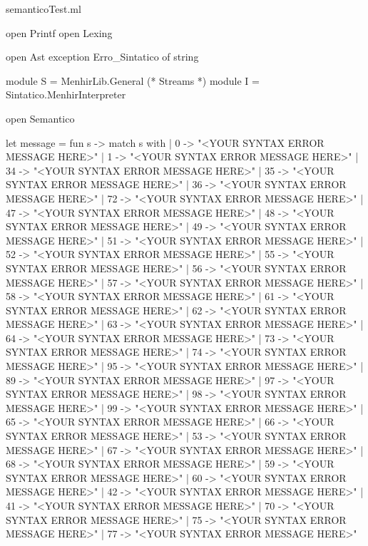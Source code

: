 \documentclass[12pt,a4paper,twoside]{article}
\begin{document}
semanticoTest.ml
\begin{terminal}
open Printf
open Lexing

open Ast
exception Erro_Sintatico of string

module S = MenhirLib.General (* Streams *)
module I = Sintatico.MenhirInterpreter

open Semantico

let message =
  fun s ->
    match s with
    | 0 ->
        "<YOUR SYNTAX ERROR MESSAGE HERE>\n"
    | 1 ->
        "<YOUR SYNTAX ERROR MESSAGE HERE>\n"
    | 34 ->
        "<YOUR SYNTAX ERROR MESSAGE HERE>\n"
    | 35 ->
        "<YOUR SYNTAX ERROR MESSAGE HERE>\n"
    | 36 ->
        "<YOUR SYNTAX ERROR MESSAGE HERE>\n"
    | 72 ->
        "<YOUR SYNTAX ERROR MESSAGE HERE>\n"
    | 47 ->
        "<YOUR SYNTAX ERROR MESSAGE HERE>\n"
    | 48 ->
        "<YOUR SYNTAX ERROR MESSAGE HERE>\n"
    | 49 ->
        "<YOUR SYNTAX ERROR MESSAGE HERE>\n"
    | 51 ->
        "<YOUR SYNTAX ERROR MESSAGE HERE>\n"
    | 52 ->
        "<YOUR SYNTAX ERROR MESSAGE HERE>\n"
    | 55 ->
        "<YOUR SYNTAX ERROR MESSAGE HERE>\n"
    | 56 ->
        "<YOUR SYNTAX ERROR MESSAGE HERE>\n"
    | 57 ->
        "<YOUR SYNTAX ERROR MESSAGE HERE>\n"
    | 58 ->
        "<YOUR SYNTAX ERROR MESSAGE HERE>\n"
    | 61 ->
        "<YOUR SYNTAX ERROR MESSAGE HERE>\n"
    | 62 ->
        "<YOUR SYNTAX ERROR MESSAGE HERE>\n"
    | 63 ->
        "<YOUR SYNTAX ERROR MESSAGE HERE>\n"
    | 64 ->
        "<YOUR SYNTAX ERROR MESSAGE HERE>\n"
    | 73 ->
        "<YOUR SYNTAX ERROR MESSAGE HERE>\n"
    | 74 ->
        "<YOUR SYNTAX ERROR MESSAGE HERE>\n"
    | 95 ->
        "<YOUR SYNTAX ERROR MESSAGE HERE>\n"
    | 89 ->
        "<YOUR SYNTAX ERROR MESSAGE HERE>\n"
    | 97 ->
        "<YOUR SYNTAX ERROR MESSAGE HERE>\n"
    | 98 ->
        "<YOUR SYNTAX ERROR MESSAGE HERE>\n"
    | 99 ->
        "<YOUR SYNTAX ERROR MESSAGE HERE>\n"
    | 65 ->
        "<YOUR SYNTAX ERROR MESSAGE HERE>\n"
    | 66 ->
        "<YOUR SYNTAX ERROR MESSAGE HERE>\n"
    | 53 ->
        "<YOUR SYNTAX ERROR MESSAGE HERE>\n"
    | 67 ->
        "<YOUR SYNTAX ERROR MESSAGE HERE>\n"
    | 68 ->
        "<YOUR SYNTAX ERROR MESSAGE HERE>\n"
    | 59 ->
        "<YOUR SYNTAX ERROR MESSAGE HERE>\n"
    | 60 ->
        "<YOUR SYNTAX ERROR MESSAGE HERE>\n"
    | 42 ->
        "<YOUR SYNTAX ERROR MESSAGE HERE>\n"
    | 41 ->
        "<YOUR SYNTAX ERROR MESSAGE HERE>\n"
    | 70 ->
        "<YOUR SYNTAX ERROR MESSAGE HERE>\n"
    | 75 ->
        "<YOUR SYNTAX ERROR MESSAGE HERE>\n"
    | 77 ->
        "<YOUR SYNTAX ERROR MESSAGE HERE>\n"

\end{terminal}
\end{document}
